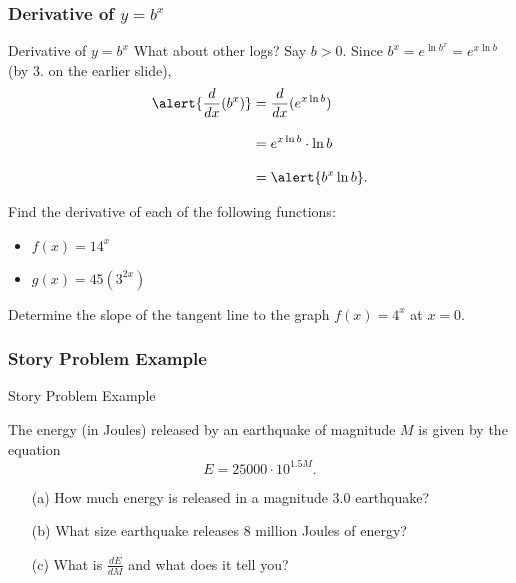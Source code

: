 \documentclass[cal1spr16Lectures.tex]{subfiles}
\begin{document}
\subsubsection{Derivative of $y=b^x$}

\begin{frame}{\small Derivative of $y=b^x$}
What about other logs?  Say $b>0$.  Since $b^x=e^{\ln b^x}=e^{x \ln b}$ (by 3. on the earlier slide), 
\begin{align*}
\alert{\frac{d}{dx}(b^x)} &= \frac{d}{dx}(e^{x \ln b}) \\[0.75pc]
 &=e^{x \ln b} \cdot \ln b \\[0.75pc]
 &= \alert{b^x \ln b}.
\end{align*}
\end{frame}

\begin{frame}
\begin{exe} Find the derivative of each of the following functions:
\begin{itemize}
\item $f(x)=14^x$
\item $g(x)=45(3^{2x})$
\end{itemize}
\end{exe}
\begin{exe} Determine the slope of the tangent line to the graph $f(x)=4^x$ at $x=0$. \end{exe}
\end{frame}

\subsubsection{Story Problem Example}

\begin{frame}{\small Story Problem Example}\footnotesize
\begin{ex} The energy (in Joules) released by an earthquake of magnitude $M$ is given by the equation
\[E=25000 \cdot 10^{1.5 M}.\]
\begin{itemize}\footnotesize
\item[(a)] How much energy is released in a magnitude 3.0 earthquake?
\item[(b)] What size earthquake releases 8 million Joules of energy?
\item[(c)] What is $\textstyle\frac{dE}{dM}$ and what does it tell you?
\end{itemize}
\end{ex}
\end{frame}
\end{document}
